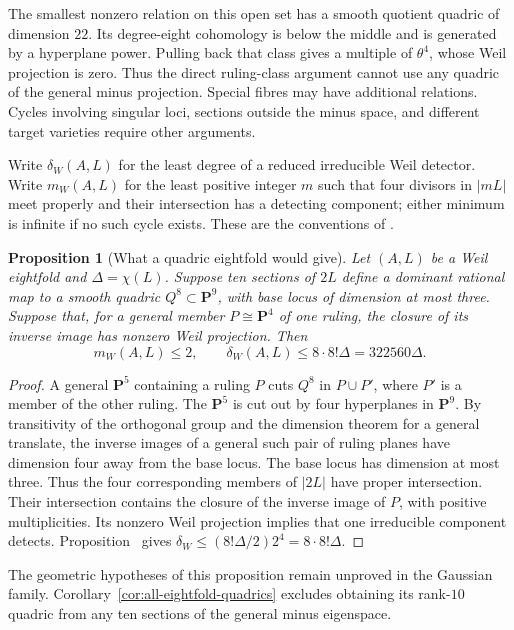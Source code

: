 \documentclass[11pt]{article}
\newtheorem{proposition}[theorem]{Proposition}
\theoremstyle{definition}
\theoremstyle{remark}
\begin{document}
The smallest nonzero relation on this open set has a smooth
quotient quadric of dimension $22$. Its degree-eight cohomology
is below the middle and is generated by a hyperplane power.
Pulling back that class gives a multiple of $\theta^4$, whose
Weil projection is zero. Thus the direct ruling-class argument
cannot use any quadric of the general minus projection.
Special fibres may have additional relations. Cycles involving
singular loci, sections outside the minus space, and different
target varieties require other arguments.

Write $\delta_W(A,L)$ for the least degree of a reduced irreducible
Weil detector. Write $m_W(A,L)$ for the least positive integer $m$
such that four divisors in $|mL|$ meet properly and their intersection
has a detecting component; either minimum is infinite if no such
cycle exists. These are the conventions of
\cite[Proposition~]{CompanionA}.

\begin{proposition}[What a quadric eightfold would give]\label{prop:quadric-gate}
Let $(A,L)$ be a Weil eightfold and $\Delta=\chi(L)$. Suppose ten sections of $2L$ define a dominant rational map to a smooth quadric $Q^8\subset\mathbf P^9$, with base locus of dimension at most three. Suppose that, for a general member $P\cong\mathbf P^4$ of one ruling, the closure of its inverse image has nonzero Weil projection. Then
\[
 m_W(A,L)\le2,\qquad \delta_W(A,L)\le8\cdot8!\Delta=322560\Delta.
\]
\end{proposition}

\begin{proof}
A general $\mathbf P^5$ containing a ruling $P$ cuts $Q^8$ in $P\cup P'$, where $P'$ is a member of the other ruling. The $\mathbf P^5$ is cut out by four hyperplanes in $\mathbf P^9$. By transitivity of the orthogonal group and the dimension theorem for a general translate, the inverse images of a general such pair of ruling planes have dimension four away from the base locus. The base locus has dimension at most three. Thus the four corresponding members of $|2L|$ have proper intersection. Their intersection contains the closure of the inverse image of $P$, with positive multiplicities. Its nonzero Weil projection implies that one irreducible component detects. Proposition~ gives
$\delta_W\le(8!\Delta/2)2^4=8\cdot8!\Delta$.
\end{proof}

The geometric hypotheses of this proposition remain unproved in
the Gaussian family. Corollary~\ref{cor:all-eightfold-quadrics}
excludes obtaining its rank-$10$ quadric from any ten sections
of the general minus eigenspace.
\end{document}
